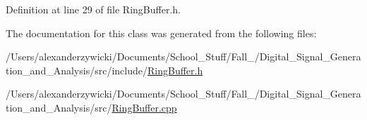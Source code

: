 Definition at line 29 of file Ring\+Buffer.\+h.



The documentation for this class was generated from the following files\+:\begin{DoxyCompactItemize}
\item 
/\+Users/alexanderzywicki/\+Documents/\+School\+\_\+\+Stuff/\+Fall\+\_/\+Digital\+\_\+\+Signal\+\_\+\+Generation\+\_\+and\+\_\+\+Analysis/src/include/\hyperlink{_ring_buffer_8h}{Ring\+Buffer.\+h}\item 
/\+Users/alexanderzywicki/\+Documents/\+School\+\_\+\+Stuff/\+Fall\+\_/\+Digital\+\_\+\+Signal\+\_\+\+Generation\+\_\+and\+\_\+\+Analysis/src/\hyperlink{_ring_buffer_8cpp}{Ring\+Buffer.\+cpp}\end{DoxyCompactItemize}
